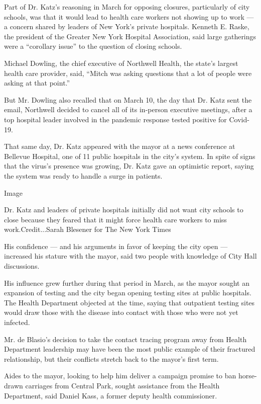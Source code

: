 Part of Dr. Katz's reasoning in March for opposing closures,
particularly of city schools, was that it would lead to health care
workers not showing up to work --- a concern shared by leaders of New
York's private hospitals. Kenneth E. Raske, the president of the Greater
New York Hospital Association, said large gatherings were a ``corollary
issue'' to the question of closing schools.

Michael Dowling, the chief executive of Northwell Health, the state's
largest health care provider, said, ``Mitch was asking questions that a
lot of people were asking at that point.''

But Mr. Dowling also recalled that on March 10, the day that Dr. Katz
sent the email, Northwell decided to cancel all of its in-person
executive meetings, after a top hospital leader involved in the pandemic
response tested positive for Covid-19.

That same day, Dr. Katz appeared with the mayor at a news conference at
Bellevue Hospital, one of 11 public hospitals in the city's system. In
spite of signs that the virus's presence was growing, Dr. Katz gave an
optimistic report, saying the system was ready to handle a surge in
patients.

Image

Dr. Katz and leaders of private hospitals initially did not want city
schools to close because they feared that it might force health care
workers to miss work.Credit...Sarah Blesener for The New York Times

His confidence --- and his arguments in favor of keeping the city open
--- increased his stature with the mayor, said two people with knowledge
of City Hall discussions.

His influence grew further during that period in March, as the mayor
sought an expansion of testing and the city began opening testing sites
at public hospitals. The Health Department objected at the time, saying
that outpatient testing sites would draw those with the disease into
contact with those who were not yet infected.

Mr. de Blasio's decision to take the contact tracing program away from
Health Department leadership may have been the most public example of
their fractured relationship, but their conflicts stretch back to the
mayor's first term.

Aides to the mayor, looking to help him deliver a campaign promise to
ban horse-drawn carriages from Central Park, sought assistance from the
Health Department, said Daniel Kass, a former deputy health
commissioner.

